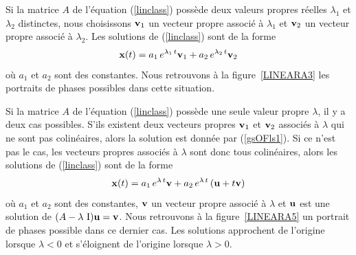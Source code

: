 {\begin{prop}
Si la matrice $A$ de l'équation (\ref{linclass}) possède deux valeurs
propres réelles $\lambda_1$ et $\lambda_2$ distinctes, nous choisissons
$\mathbf{v}_1$ un vecteur propre associé à $\lambda_1$ et $\mathbf{v}_2$ un
vecteur propre associé à $\lambda_2$.  Les solutions de
(\ref{linclass}) sont de la forme
\begin{equation}\label{gsOFls1}
\mathbf{x}(t)= a_1\,e^{\lambda_1\,t} \mathbf{v}_1 + a_2\,e^{\lambda_2\,t}
\mathbf{v}_2
\end{equation}
où $a_1$ et $a_2$ sont des constantes.  Nous retrouvons à la
figure~\ref{LINEARA3} les portraits de phases possibles dans cette
situation.
\end{prop}


\begin{prop}
Si la matrice $A$ de l'équation (\ref{linclass}) possède une seule
valeur propre $\lambda$, il y a deux cas possibles.  S'ils existent deux
vecteurs propres $\mathbf{v}_1$ et $\mathbf{v}_2$ associés à $\lambda$ qui
ne sont pas colinéaires, alors la solution est donnée par
(\ref{gsOFls1}).  Si ce n'est pas le cas, les vecteurs propres
associés à $\lambda$ sont donc tous colinéaires, alors les solutions de
(\ref{linclass}) sont de la forme
\[
\mathbf{x}(t)= a_1\,e^{\lambda\,t} \mathbf{v} + a_2\,e^{\lambda\,t}
\left( \mathbf{u} + t \mathbf{v} \right)
\]
où $a_1$ et $a_2$ sont des constantes, $\mathbf{v}$ un vecteur propre
associé à $\lambda$ et $\mathbf{u}$ est une solution de
$(A-\lambda\,\operatorname{I})\mathbf{u} = \mathbf{v}$.
Nous retrouvons à la figure~\ref{LINEARA5} un portrait de phases possible
dans ce dernier cas.  Les solutions approchent de l'origine lorsque
$\lambda<0$ et s'éloignent de l'origine lorsque $\lambda>0$.
\end{prop}


}
